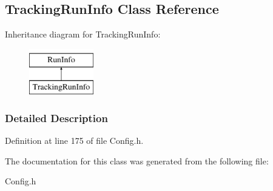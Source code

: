 \hypertarget{classTrackingRunInfo}{
\subsection{TrackingRunInfo Class Reference}
\label{classTrackingRunInfo}
}
Inheritance diagram for TrackingRunInfo:\begin{figure}[H]
\begin{center}
\leavevmode
\includegraphics[height=2.000000cm]{classTrackingRunInfo}
\end{center}
\end{figure}


\subsubsection{Detailed Description}


Definition at line 175 of file Config.h.



The documentation for this class was generated from the following file:\begin{DoxyCompactItemize}
\item 
Config.h\end{DoxyCompactItemize}

